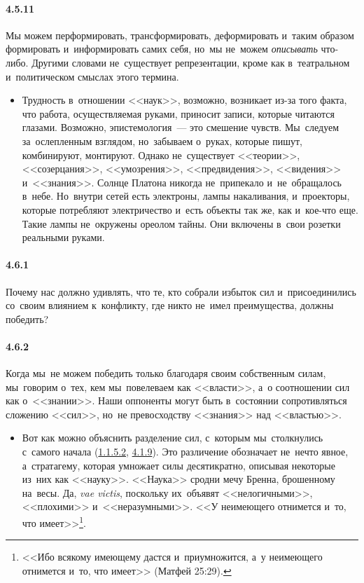 \paragraph{4.5.11}\hypertarget{par:4.5.11}{}Мы можем перформировать, трансформировать, деформировать и~таким образом формировать и~информировать самих себя, но~мы не~можем {\itshape описывать} что-либо. Другими словами не~существует репрезентации, кроме как в~театральном и~политическом смыслах этого термина. 
	\begin{itemize}
	\item 
	Трудность в~отношении <<наук>>, возможно, возникает из-за того факта, что работа, осуществляемая руками, приносит записи, которые читаются глазами. Возможно, эпистемология~--- это смешение чувств. Мы~следуем за~ослепленным взглядом, но~забываем о~руках, которые пишут, комбинируют, монтируют. Однако не~существует <<теории>>, <<созерцания>>, <<умозрения>>, <<предвидения>>, <<видения>> и~<<знания>>. Солнце Платона никогда не~припекало и~не~обращалось в~небе. Но~внутри сетей есть электроны, лампы накаливания, и~проекторы, которые потребляют электричество и~есть объекты так же, как и~кое-что еще. Такие лампы не~окружены ореолом тайны. Они включены в~свои розетки реальными руками.
	\end{itemize}	


\paragraph{4.6.1}\hypertarget{par:4.6.1}{} Почему нас должно удивлять, что те, кто собрали избыток сил и~присоединились со~своим влиянием к~конфликту, где никто не~имел преимущества, должны победить?


\paragraph{4.6.2}\hypertarget{par:4.6.2}{} Когда мы~не можем победить только благодаря своим собственным силам, мы~говорим о~тех, кем мы~повелеваем как <<власти>>, а~о соотношении сил как о~<<знании>>. Наши оппоненты могут быть в~состоянии сопротивляться сложению <<сил>>, но~не превосходству <<знания>> над <<властью>>.
	\begin{itemize}
	\item 
	Вот как можно объяснить разделение сил, с~которым мы~столкнулись с~самого начала (\hyperlink{par:1.1.5.2}{1.1.5.2}, \hyperlink{par:4.1.9}{4.1.9}). Это различение обозначает не~нечто явное, а~стратагему, которая умножает силы десятикратно, описывая некоторые из~них как <<науку>>. <<Наука>> сродни мечу Бренна, брошенному на~весы. Да, {\itshape vae victis}, поскольку их~объявят <<нелогичными>>, <<плохими>> и~<<неразумными>>. <<У неимеющего отнимется и~то, что имеет>>\footnote{<<Ибо всякому имеющему дастся и~приумножится, а~у неимеющего отнимется и~то, что имеет>> (Матфей 25:29).}. 
	\end{itemize}	

